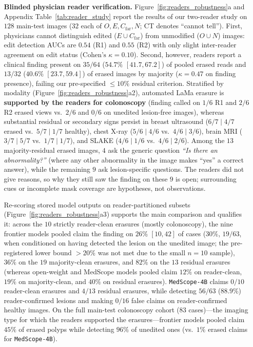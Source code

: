 \documentclass[5p,times,twocolumn,authoryear]{elsarticle}
\begin{document}
\textbf{Blinded physician reader verification.} Figure~\ref{fig:readers_robustness}a and Appendix Table~\ref{tab:reader_study} report the results of our two-reader study on $128$ main-test images ($32$ each of $O, E, C_{\text{far}}, N$; CT denotes ``cannot tell''). First, physicians cannot distinguish edited ($E \cup C_{\text{far}}$) from unmodified ($O \cup N$) images: edit detection AUCs are $0.54$ (R1) and $0.55$ (R2) with only slight inter-reader agreement on edit status ($\text{Cohen's }\kappa = 0.10$). Second, however, readers report a clinical finding present on $35/64$ ($54.7\%$ $[41.7, 67.2]$) of pooled erased reads and $13/32$ ($40.6\%$ $[23.7, 59.4]$) of erased images by majority ($\kappa = 0.47$ on finding presence), failing our pre-specified $\le 10\%$ residual criterion. Stratified by modality (Figure~\ref{fig:readers_robustness}a2), automated LaMa erasure is \textbf{supported by the readers for colonoscopy} (finding called on $1/6$ R1 and $2/6$ R2 erased views vs.\ $2/6$ and $0/6$ on unedited lesion-free images), whereas substantial residual or secondary signs persist in breast ultrasound ($6/7 \mid 4/7$ erased vs.\ $5/7 \mid 1/7$ healthy), chest X-ray ($5/6 \mid 4/6$ vs.\ $4/6 \mid 3/6$), brain MRI ($3/7 \mid 5/7$ vs.\ $1/7 \mid 1/7$), and SLAKE ($4/6 \mid 1/6$ vs.\ $4/6 \mid 2/6$). Among the $13$ majority-residual erased images, $4$ ask the generic question \emph{``Is there an abnormality?''} (where any other abnormality in the image makes ``yes'' a correct answer), while the remaining $9$ ask lesion-specific questions. The readers did not give reasons, so why they still saw the finding on these $9$ is open; surrounding cues or incomplete mask coverage are hypotheses, not observations.

Re-scoring stored model outputs on reader-partitioned subsets (Figure~\ref{fig:readers_robustness}a3) supports the main comparison and qualifies it: across the $10$ strictly reader-clean erasures (mostly colonoscopy), the nine frontier models pooled claim the finding on $26\%$ $[10, 42]$ of cases ($30\%$, $19/63$, when conditioned on having detected the lesion on the unedited image; the pre-registered lower bound $>20\%$ was not met due to the small $n=10$ sample), $36\%$ on the $19$ majority-clean erasures, and $82\%$ on the $13$ residual erasures (whereas open-weight and MedScope models pooled claim $12\%$ on reader-clean, $19\%$ on majority-clean, and $40\%$ on residual erasures). \texttt{MedScope-4B} claims $0/10$ reader-clean erasures and $4/13$ residual erasures, while detecting $56/63$ ($88.9\%$) reader-confirmed lesions and making $0/16$ false claims on reader-confirmed healthy images. On the full main-test colonoscopy cohort ($83$ cases)---the imaging type for which the readers supported the erasures---frontier models pooled claim $45\%$ of erased polyps while detecting $96\%$ of unedited ones (vs.\ $1\%$ erased claims for \texttt{MedScope-4B}).
\end{document}
